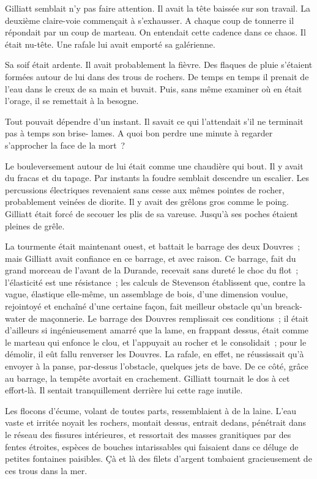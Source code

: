 \documentclass[french,twoside]{book} %
\begin{document}
Gilliatt semblait n’y pas faire attention. Il avait la tête baissée sur son travail. La deuxième claire-voie commençait à s’exhausser. A chaque coup de tonnerre il répondait par un coup de marteau. On entendait cette cadence dans ce chaos. Il était nu-tête. Une rafale lui avait emporté sa galérienne.\par
Sa soif était ardente. Il avait probablement la fièvre. Des flaques de pluie s’étaient formées autour de lui dans des trous de rochers. De temps en temps il prenait de l’eau dans le creux de sa main et buvait. Puis, sans même examiner où en était l’orage, il se remettait à la besogne.\par
Tout pouvait dépendre d’un instant. Il savait ce qui l’attendait s’il ne terminait pas à temps son brise- lames. A quoi bon perdre une minute à regarder s’approcher la face de la mort ?\par
Le bouleversement autour de lui était comme une chaudière qui bout. Il y avait du fracas et du tapage. Par instants la foudre semblait descendre un escalier. Les percussions électriques revenaient sans cesse aux mêmes pointes de rocher, probablement veinées de diorite. Il y avait des grêlons gros comme le poing. Gilliatt était forcé de secouer les plis de sa vareuse. Jusqu’à ses poches étaient pleines de grêle.\par
La tourmente était maintenant ouest, et battait le barrage des deux Douvres ; mais Gilliatt avait confiance en ce barrage, et avec raison. Ce barrage, fait du grand morceau de l’avant de la Durande, recevait sans dureté le choc du flot ; l’élasticité est une résistance ; les calculs de Stevenson établissent que, contre la vague, élastique elle-même, un assemblage de bois, d’une dimension voulue, rejointoyé et enchaîné d’une certaine façon, fait meilleur obstacle qu’un breack-water de maçonnerie. Le barrage des Douvres remplissait ces conditions ; il était d’ailleurs si ingénieusement amarré que la lame, en frappant dessus, était comme le marteau qui enfonce le clou, et l’appuyait au rocher et le consolidait ; pour le démolir, il eût fallu renverser les Douvres. La rafale, en effet, ne réussissait qu’à envoyer à la panse, par-dessus l’obstacle, quelques jets de bave. De ce côté, grâce au barrage, la tempête avortait en crachement. Gilliatt tournait le dos à cet effort-là. Il sentait tranquillement derrière lui cette rage inutile.\par
 Les flocons d’écume, volant de toutes parts, ressemblaient à de la laine. L’eau vaste et irritée noyait les rochers, montait dessus, entrait dedans, pénétrait dans le réseau des fissures intérieures, et ressortait des masses granitiques par des fentes étroites, espèces de bouches intarissables qui faisaient dans ce déluge de petites fontaines paisibles. Çà et là des filets d’argent tombaient gracieusement de ces trous dans la mer.\par
\end{document}
